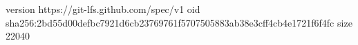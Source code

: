 version https://git-lfs.github.com/spec/v1
oid sha256:2bd55d00defbc7921d6cb23769761f5707505883ab38e3cff4cb4e1721f6f4fc
size 22040

